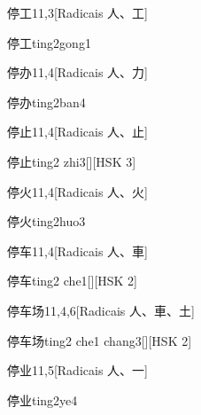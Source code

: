 \begin{entry}{停工}{11,3}[Radicais ⼈、⼯]
  \begin{phonetics}{停工}{ting2gong1}
  \end{phonetics}
\end{entry}

\begin{entry}{停办}{11,4}[Radicais ⼈、⼒]
  \begin{phonetics}{停办}{ting2ban4}
  \end{phonetics}
\end{entry}

\begin{entry}{停止}{11,4}[Radicais ⼈、⽌]
  \begin{phonetics}{停止}{ting2 zhi3}[][HSK 3]
  \end{phonetics}
\end{entry}

\begin{entry}{停火}{11,4}[Radicais ⼈、⽕]
  \begin{phonetics}{停火}{ting2huo3}
  \end{phonetics}
\end{entry}

\begin{entry}{停车}{11,4}[Radicais ⼈、⾞]
  \begin{phonetics}{停车}{ting2 che1}[][HSK 2]
  \end{phonetics}
\end{entry}

\begin{entry}{停车场}{11,4,6}[Radicais ⼈、⾞、⼟]
  \begin{phonetics}{停车场}{ting2 che1 chang3}[][HSK 2]
  \end{phonetics}
\end{entry}

\begin{entry}{停业}{11,5}[Radicais ⼈、⼀]
  \begin{phonetics}{停业}{ting2ye4}
  \end{phonetics}
\end{entry}

